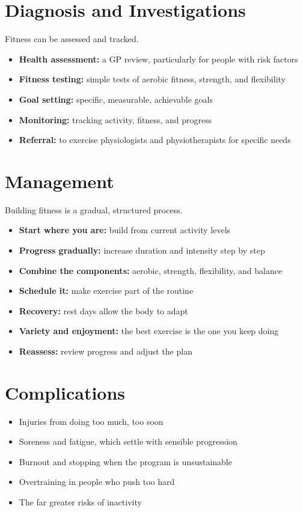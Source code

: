 \section*{Diagnosis and Investigations}
Fitness can be assessed and tracked.
\begin{itemize}
    \item \textbf{Health assessment:} a GP review, particularly for people with risk factors
    \item \textbf{Fitness testing:} simple tests of aerobic fitness, strength, and flexibility
    \item \textbf{Goal setting:} specific, measurable, achievable goals
    \item \textbf{Monitoring:} tracking activity, fitness, and progress
    \item \textbf{Referral:} to exercise physiologists and physiotherapists for specific needs
\end{itemize}

\section*{Management}
Building fitness is a gradual, structured process.
\begin{itemize}
    \item \textbf{Start where you are:} build from current activity levels
    \item \textbf{Progress gradually:} increase duration and intensity step by step
    \item \textbf{Combine the components:} aerobic, strength, flexibility, and balance
    \item \textbf{Schedule it:} make exercise part of the routine
    \item \textbf{Recovery:} rest days allow the body to adapt
    \item \textbf{Variety and enjoyment:} the best exercise is the one you keep doing
    \item \textbf{Reassess:} review progress and adjust the plan
\end{itemize}

\section*{Complications}
\begin{itemize}
    \item Injuries from doing too much, too soon
    \item Soreness and fatigue, which settle with sensible progression
    \item Burnout and stopping when the program is unsustainable
    \item Overtraining in people who push too hard
    \item The far greater risks of inactivity
\end{itemize}

